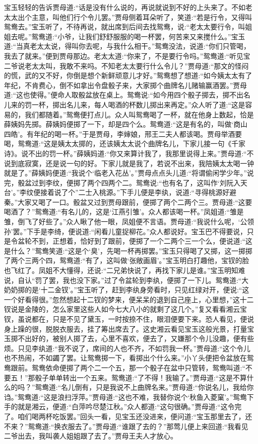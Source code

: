 \begin{parag}
    宝玉轻轻的告诉贾母道:“话是没有什么说的，再说就说到不好的上头来了。不如老太太出个主意，叫他们行个令儿罢。”贾母侧着耳朵听了，笑道:“若是行令，又得叫鸳鸯去。”宝玉听了，不待再说，就出席到后间去找鸳鸯，说:“老太太要行令，叫姐姐去呢。”鸳鸯道:“小爷，让我们舒舒服服的喝一杯罢，何苦来又来搅什么。”宝玉道:“当真老太太说，得叫你去呢，与我什么相干。”鸳鸯没法，说道:“你们只管喝，我去了就来。”便到贾母那边。老太太道:“你来了，不是要行令吗。”鸳鸯道:“听见宝二爷说老太太叫，我敢不来吗。不知老太太要行什么令儿？”贾母道:“那文的怪闷的慌，武的又不好，你倒是想个新鲜顽意儿才好。”鸳鸯想了想道:“如今姨太太有了年纪，不肯费心，倒不如拿出令盘骰子来，大家掷个曲牌名儿赌输赢酒罢。”贾母道:“这也使得。”便命人取骰盆放在桌上。鸳鸯说:“如今用四个骰子掷去，掷不出名儿来的罚一杯，掷出名儿来，每人喝酒的杯数儿掷出来再定。”众人听了道:“这是容易的，我们都随着。”鸳鸯便打点儿。众人叫鸳鸯喝了一杯，就在他身上数起，恰是薛姨妈先掷。薛姨妈便掷了一下，却是四个么。鸳鸯道:“这是有名的，叫做‘商山四皓’。有年纪的喝一杯。”于是贾母，李婶娘，邢王二夫人都该喝。贾母举酒要喝，鸳鸯道:“这是姨太太掷的，还该姨太太说个曲牌名儿，下家儿接一句《千家诗》。说不出的罚一杯。”薛姨妈道:“你又来算计我了，我那里说得上来。”贾母道:“不说到底寂寞，还是说一句的好。下家儿就是我了，若说不出来，我陪姨太太喝一钟就是了。”薛姨妈便道:“我说个‘临老入花丛’。”贾母点点头儿道:“将谓偷闲学少年。”说完，骰盆过到李纹，便掷了两个四两个二。鸳鸯说:“也有名了，这叫作‘刘阮入天台’。”李纹便接着说了个”二士入桃源。”下手儿便是李纨，说道:“寻得桃源好避秦。”大家又喝了一口。骰盆又过到贾母跟前，便掷了两个二两个三。贾母道:“这要喝酒了？”鸳鸯道:“有名儿的，这是‘江燕引雏’。众人都该喝一杯。”凤姐道:“雏是雏，倒飞了好些了。”众人瞅了他一眼，凤姐便不言语。贾母道:“我说什么呢，‘公领孙’罢。”下手是李绮，便说道:“闲看儿童捉柳花。”众人都说好。宝玉巴不得要说，只是令盆轮不到，正想着，恰好到了跟前，便掷了一个二两个三一个么，便说道:“这是什么？”鸳鸯笑道:“这是个‘臭’，先喝一杯再掷罢。”宝玉只得喝了又掷，这一掷掷了两个三两个四，鸳鸯道:“有了，这叫做‘张敞画眉’。”宝玉明白打趣他，宝钗的脸也飞红了。凤姐不大懂得，还说:“二兄弟快说了，再找下家儿是谁。”宝玉明知难说，自认“罚了罢，我也没下家。”过了令盆轮到李纨，便掷了一下儿。鸳鸯道:“大奶奶掷的是‘十二金钗’。”宝玉听了，赶到李纨身旁看时，只见红绿对开，便说:“这一个好看得很。”忽然想起十二钗的梦来，便呆呆的退到自己座上，心里想，”这十二钗说是金陵的，怎么家里这些人如今七大八小的就剩了这几个。”复又看看湘云宝钗，虽说都在，只是不见了黛玉，一时按捺不住，眼泪便要下来。恐人看见，便说身上躁的很，脱脱衣服去，挂了筹出席去了。这史湘云看见宝玉这般光景，打量宝玉掷不出好的，被别人掷了去，心里不喜欢，便去了，又嫌那个令儿没趣，便有些烦。只见李纨道:“我不说了，席间的人也不齐，不如罚我一杯。”贾母道:“这个令儿也不热闹，不如蠲了罢。让鸳鸯掷一下，看掷出个什么来。”小丫头便把令盆放在鸳鸯跟前。鸳鸯依命便掷了两个二一个五，那一个骰子在盆中只管转，鸳鸯叫道:“不要五！”那骰子单单转出一个五来。鸳鸯道:“了不得！我输了。”贾母道:“这是不算什么的吗？”鸳鸯道:“名儿倒有，只是我说不上曲牌名来。”贾母道:“你说名儿，我给你诌。”鸳鸯道:“这是浪扫浮萍。”贾母道:“这也不难，我替你说个‘秋鱼入菱窠’。”鸳鸯下手的就是湘云，便道:“白萍吟尽楚江秋。”众人都道:“这句很确。”贾母道:“这令完了。咱们喝两杯吃饭罢。”回头一看，见宝玉还没进来，便问道:“宝玉那里去了，还不来？”鸳鸯道:“换衣服去了。”贾母道:“谁跟了去的？”那莺儿便上来回道:“我看见二爷出去，我叫袭人姐姐跟了去了。”贾母王夫人才放心。

\end{parag}
